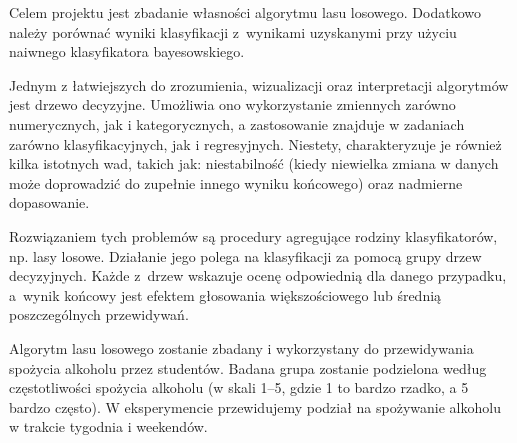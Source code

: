 Celem projektu jest zbadanie własności algorytmu lasu losowego. Dodatkowo należy porównać wyniki klasyfikacji z~wynikami uzyskanymi przy użyciu naiwnego klasyfikatora bayesowskiego.

Jednym z łatwiejszych do zrozumienia, wizualizacji oraz interpretacji algorytmów jest drzewo decyzyjne. Umożliwia ono wykorzystanie zmiennych zarówno numerycznych, jak i
kategorycznych, a zastosowanie znajduje w zadaniach zarówno klasyfikacyjnych, jak i regresyjnych. Niestety, charakteryzuje je również kilka istotnych wad, takich jak: niestabilność (kiedy niewielka zmiana w danych może doprowadzić do zupełnie innego wyniku
końcowego) oraz nadmierne dopasowanie.

Rozwiązaniem tych problemów są procedury agregujące rodziny klasyfikatorów, np. lasy losowe.
Działanie jego polega na klasyfikacji za pomocą grupy drzew decyzyjnych. Każde z~drzew wskazuje
ocenę odpowiednią dla danego przypadku, a~wynik końcowy jest efektem głosowania większościowego lub średnią poszczególnych przewidywań.

Algorytm lasu losowego zostanie zbadany i wykorzystany do przewidywania spożycia alkoholu przez studentów. Badana grupa zostanie podzielona według częstotliwości spożycia alkoholu (w skali 1--5, gdzie 1 to bardzo rzadko, a 5 bardzo często). W eksperymencie przewidujemy podział na spożywanie alkoholu w trakcie tygodnia i weekendów.